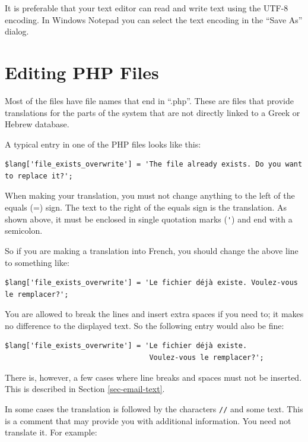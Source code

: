 \documentclass[11pt,oneside,a4paper]{memoir}
\begin{document}
It is preferable that your text editor can read and write text using the UTF-8 encoding. In Windows
Notepad you can select the text encoding in the ``Save As'' dialog.




\chapter{Editing PHP Files}

Most of the files have file names that end in ``.php''. These are files that provide translations
for the parts of the system that are not directly linked to a Greek or Hebrew database.

A typical entry in one of the PHP files looks like this:

\begin{lstlisting}
$lang['file_exists_overwrite'] = 'The file already exists. Do you want to replace it?';
\end{lstlisting}

When making your translation, you must not change anything to the left of the equals (=) sign. The
text to the right of the equals sign is the translation. As shown above, it must be enclosed in
single quotation marks (\verb|'|) and end with a semicolon.

So if you are making a translation into French, you should change the above line to something like:

\begin{lstlisting}
$lang['file_exists_overwrite'] = 'Le fichier déjà existe. Voulez-vous le remplacer?';
\end{lstlisting}

You are allowed to break the lines and insert extra spaces if you need to; it makes no difference to
the displayed text. So the following entry would also be fine:

\begin{lstlisting}
$lang['file_exists_overwrite'] = 'Le fichier déjà existe.
                                  Voulez-vous le remplacer?';
\end{lstlisting}

There is, however, a few cases where line breaks and spaces must not be inserted. This is described
in Section \ref{sec-email-text}.

In some cases the translation is followed by the characters \verb|//| and some text. This is a
comment that may provide you with additional information. You need not translate it. For example:
\end{document}
